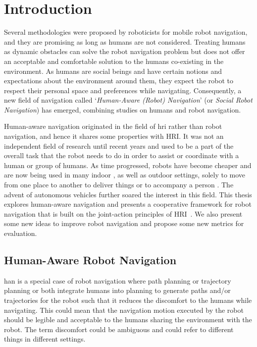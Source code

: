 \chapter*{Introduction}
Several methodologies were proposed by roboticists for mobile robot navigation, and they are promising as long as humans are not considered. Treating humans as dynamic obstacles can solve the robot navigation problem but does not offer an acceptable and comfortable solution to the humans co-existing in the environment. As humans are social beings and have certain notions and expectations about the environment around them, they expect the robot to respect their personal space and preferences while navigating. Consequently, a new field of navigation called `\textit{Human-Aware (Robot) Navigation}' (or \textit{Social Robot Navigation}) has emerged, combining studies on humans and robot navigation. 

Human-aware navigation originated in the field of \acrfull{hri} rather than robot navigation, and hence it shares some properties with HRI. It was not an independent field of research until recent years and used to be a part of the overall task that the robot needs to do in order to assist or coordinate with a human or group of humans. As time progressed, robots have become cheaper and are now being used in many indoor \cite{guldenring2020learning}, as well as outdoor \cite{ferrer2013social} settings, solely to move from one place to another to deliver things \cite{bogue2016growth} or to accompany a person \cite{repiso2017line}. The advent of autonomous vehicles \cite{rasouli2019autonomous} further soared the interest in this field. This thesis explores human-aware navigation and presents a cooperative framework for robot navigation that is built on the joint-action principles of HRI~\cite{curioni2019joint}. We also present some new ideas to improve robot navigation and propose some new metrics for evaluation.     

\section*{Human-Aware Robot Navigation}
\acrfull{han} is a special case of robot navigation where path planning or trajectory planning or both integrate humans into planning to generate paths and/or trajectories for the robot such that it reduces the discomfort to the humans while navigating. This could mean that the navigation motion executed by the robot should be legible and acceptable to the humans sharing the environment with the robot. The term discomfort could be ambiguous and could refer to different things in different settings. 

